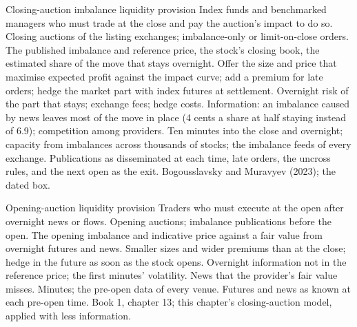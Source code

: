 \begin{strategyfile}{Closing-auction imbalance liquidity provision}\label{strat:hf:auctions-and-the-close:close}
 Index funds and benchmarked managers who must trade at the close and pay the auction's impact to do so.
 Closing auctions of the listing exchanges; imbalance-only or limit-on-close orders.
 The published imbalance and reference price, the stock's closing book, the estimated share of the move that stays overnight.
 Offer the size and price that maximise expected profit against the impact curve; add a premium for late orders; hedge
the market part with index futures at settlement.
 Overnight risk of the part that stays; exchange fees; hedge costs.
 Information: an imbalance caused by news leaves most of the move in place (4 cents a share at half staying instead of 6.9);
competition among providers.
 Ten minutes into the close and overnight; capacity from imbalances across thousands of stocks; the
imbalance feeds of every exchange.
 Publications as disseminated at each time, late orders, the uncross rules, and the next open as the exit.
 Bogousslavsky and Muravyev (2023); the dated box.
\end{strategyfile}

\begin{strategyfile}{Opening-auction liquidity provision}\label{strat:hf:auctions-and-the-close:open}
 Traders who must execute at the open after overnight news or flows.
 Opening auctions; imbalance publications before the open.
 The opening imbalance and indicative price against a fair value from overnight futures and news.
 Smaller sizes and wider premiums than at the close; hedge in the future as soon as the stock opens.
 Overnight information not in the reference price; the first minutes' volatility.
 News that the provider's fair value misses.
 Minutes; the pre-open data of every venue.
 Futures and news as known at each pre-open time.
 Book 1, chapter 13; this chapter's closing-auction model, applied with less information.
\end{strategyfile}

